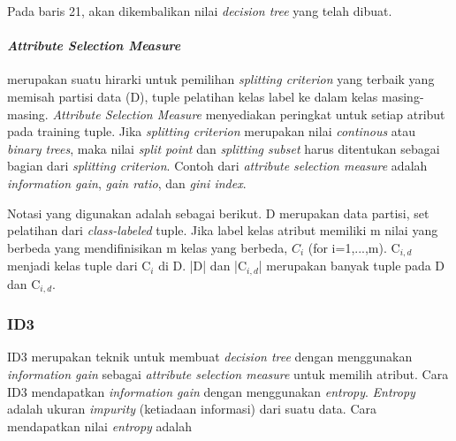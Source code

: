 Pada baris 21, akan dikembalikan nilai \textsl{decision tree} yang telah dibuat.

\paragraph{\textsl{Attribute Selection Measure}} merupakan suatu hirarki untuk pemilihan \textsl{splitting criterion} yang terbaik yang memisah partisi data (D), tuple pelatihan kelas label ke dalam kelas masing-masing. \textsl{Attribute Selection Measure} menyediakan peringkat untuk setiap atribut pada training tuple. Jika \textsl{splitting criterion} merupakan nilai \textsl{continous} atau \textsl{binary trees}, maka nilai \textsl{split point} dan \textsl{splitting subset} harus ditentukan sebagai bagian dari \textsl{splitting criterion}. Contoh dari \textsl{attribute selection measure} adalah \textsl{information gain}, \textsl{gain ratio}, dan \textsl{gini index}.

Notasi yang digunakan adalah sebagai berikut. D merupakan data partisi, set pelatihan dari \textsl{class-labeled} tuple. Jika label kelas atribut memiliki m nilai yang berbeda yang mendifinisikan m kelas yang berbeda, $C_{i}$ (for i=1,...,m). C$_{i,d}$ menjadi kelas tuple dari C$_{i}$ di D. |D| dan |C$_{i,d}$| merupakan banyak tuple pada D dan C$_{i,d}$.

\subsubsection{ID3}

ID3 merupakan teknik untuk membuat \textsl{decision tree} dengan menggunakan \textsl{information gain} sebagai \textsl{attribute selection measure} untuk memilih atribut. Cara ID3 mendapatkan \textsl{information gain} dengan menggunakan \textsl{entropy}. \textsl{Entropy} adalah ukuran \textsl{impurity} (ketiadaan informasi) dari suatu data. Cara mendapatkan nilai \textsl{entropy} adalah


